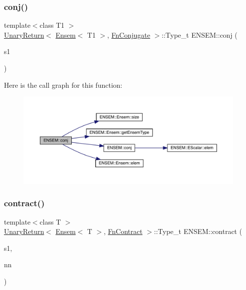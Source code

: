 \subsubsection{\texorpdfstring{conj()}{conj()}}
{\footnotesize\ttfamily template$<$class T1 $>$ \\
\mbox{\hyperlink{structENSEM_1_1UnaryReturn}{Unary\+Return}}$<$ \mbox{\hyperlink{classENSEM_1_1Ensem}{Ensem}}$<$ T1 $>$, \mbox{\hyperlink{structENSEM_1_1FnConjugate}{Fn\+Conjugate}} $>$\+::Type\+\_\+t E\+N\+S\+E\+M\+::conj (\begin{DoxyParamCaption}\item[{const \mbox{\hyperlink{classENSEM_1_1Ensem}{Ensem}}$<$ T1 $>$ \&}]{s1 }\end{DoxyParamCaption})\hspace{0.3cm}{\ttfamily [inline]}}

Here is the call graph for this function\+:\nopagebreak
\begin{figure}[H]
\begin{center}
\leavevmode
\includegraphics[width=350pt]{d1/d9e/group__eensem_ga539331970eb8111bc1c56f049612dce8_cgraph}
\end{center}
\end{figure}
\mbox{\label{group__eensem_ga1ad11b55c96293cf6f5e776c6c9d0f1b}} 
\subsubsection{\texorpdfstring{contract()}{contract()}}
{\footnotesize\ttfamily template$<$class T $>$ \\
\mbox{\hyperlink{structENSEM_1_1UnaryReturn}{Unary\+Return}}$<$ \mbox{\hyperlink{classENSEM_1_1Ensem}{Ensem}}$<$ T $>$, \mbox{\hyperlink{structENSEM_1_1FnContract}{Fn\+Contract}} $>$\+::Type\+\_\+t E\+N\+S\+E\+M\+::contract (\begin{DoxyParamCaption}\item[{const \mbox{\hyperlink{classENSEM_1_1Ensem}{Ensem}}$<$ T $>$ \&}]{s1,  }\item[{const \mbox{\hyperlink{classXMLArray_1_1Array}{Array}}$<$ int $>$ \&}]{nn }\end{DoxyParamCaption})\hspace{0.3cm}{\ttfamily [inline]}}


